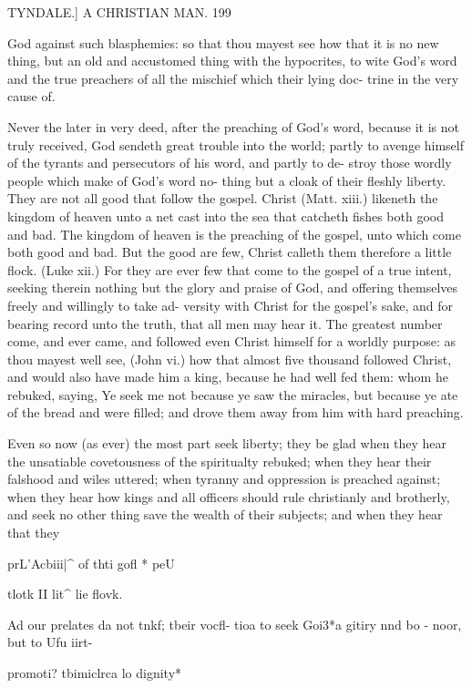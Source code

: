 \documentclass{custom}
\begin{document}
TYNDALE.]
A CHRISTIAN MAN.
199

God against such blasphemies: so that thou mayest see 
how that it is no new thing, but an old and accustomed 
thing with the hypocrites, to wite God's word and the 
true preachers of all the mischief which their lying doc- 
trine in the very cause of.

Never the later in very deed, after the preaching of 
God's word, because it is not truly received, God sendeth 
great trouble into the world; partly to avenge himself of 
the tyrants and persecutors of his word, and partly to de- 
stroy those wordly people which make of God's word no- 
thing but a cloak of their fleshly liberty. They are not 
all good that follow the gospel. Christ (Matt. xiii.) likeneth 
the kingdom of heaven unto a net cast into the sea that 
catcheth fishes both good and bad. The kingdom of 
heaven is the preaching of the gospel, unto which come 
both good and bad. But the good are few, Christ 
calleth them therefore a little flock. (Luke xii.) For they 
are ever few that come to the gospel of a true intent,
seeking therein nothing but the glory and praise of God,
and offering themselves freely and willingly to take ad- 
versity with Christ for the gospel's sake, and for bearing 
record unto the truth, that all men may hear it. The 
greatest number come, and ever came, and followed even 
Christ himself for a worldly purpose: as thou mayest well 
see, (John vi.) how that almost five thousand followed 
Christ, and would also have made him a king, because he 
had well fed them: whom he rebuked, saying, Ye seek me 
not because ye saw the miracles, but because ye ate of the 
bread and were filled; and drove them away from him with 
hard preaching.

Even so now (as ever) the most part seek liberty; they 
be glad when they hear the unsatiable covetousness of the 
spiritualty rebuked; when they hear their falshood and 
wiles uttered; when tyranny and oppression is preached 
against; when they hear how kings and all officers should 
rule christianly and brotherly, and seek no other thing save 
the wealth of their subjects; and when they hear that they 

prL'Acbiii|^ 
of thti gofl * 
peU 

tlotk II lit^ 
lie flovk. 

Ad our 
prelates da 
not tnkf; 
tbeir vocfl- 
tioa to seek 
Goi3*a gitiry 
nnd bo - 
noor, but 
to Ufu iirt- 

promoti? 
tbimiclrca 
lo dignity* 
\end{document}
